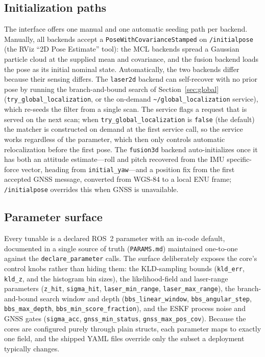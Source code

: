 \subsection{Initialization paths}
The interface offers one manual and one automatic seeding path per
backend. Manually, all backends accept a
\texttt{PoseWithCovarianceStamped} on \texttt{/initialpose} (the RViz
``2D Pose Estimate'' tool): the MCL backends spread a Gaussian particle
cloud at the supplied mean and covariance, and the fusion backend loads
the pose as its initial nominal state. Automatically, the two backends
differ because their sensing differs. The \texttt{laser2d} backend can
self-recover with no prior pose by running the branch-and-bound search
of Section~\ref{sec:global} (\texttt{try\_global\_localization}, or the
on-demand \texttt{\textasciitilde/global\_localization} service), which
re-seeds the filter from a single scan. The service flags a
request that is served on the next scan; when
\texttt{try\_global\_localization} is \texttt{false} (the default) the
matcher is constructed on demand at the first service call, so the
service works regardless of the parameter, which then only controls
automatic relocalization before the first pose. The \texttt{fusion3d} backend
auto-initializes once it has both an attitude estimate---roll and pitch
recovered from the IMU specific-force vector, heading from
\texttt{initial\_yaw}---and a position fix from the first accepted GNSS
message, converted from WGS-84 to a local ENU frame; \texttt{/initialpose}
overrides this when GNSS is unavailable.

\subsection{Parameter surface}
Every tunable is a declared ROS~2 parameter with an in-code default,
documented in a single source of truth (\texttt{PARAMS.md}) maintained
one-to-one against the \texttt{declare\_parameter} calls. The surface deliberately
exposes the core's control knobs rather than hiding them: the
KLD-sampling bounds (\texttt{kld\_err}, \texttt{kld\_z}, and the
histogram bin sizes), the likelihood-field and laser-range parameters
(\texttt{z\_hit}, \texttt{sigma\_hit}, \texttt{laser\_min\_range},
\texttt{laser\_max\_range}), the branch-and-bound search window and
depth (\texttt{bbs\_linear\_window}, \texttt{bbs\_angular\_step},
\texttt{bbs\_max\_depth}, \texttt{bbs\_min\_score\_fraction}), and the
ESKF process noise and GNSS gates (\texttt{sigma\_acc},
\texttt{gnss\_min\_status}, \texttt{gnss\_max\_pos\_cov}). Because the
cores are configured purely through plain structs, each parameter maps
to exactly one field, and the shipped YAML files override only the
subset a deployment typically changes.

